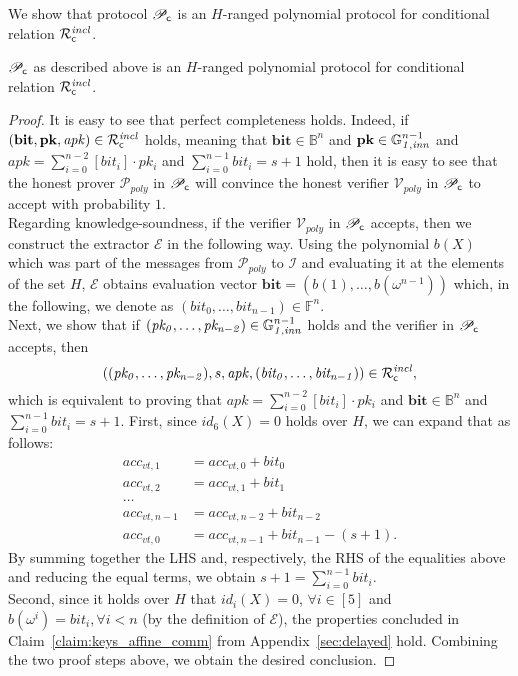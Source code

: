 \noindent We show that protocol $\mathscr{P}_{\mathsf{c}}$ is an $H$-ranged polynomial protocol for conditional relation 
$\mathcal{R}^{\mathit{incl}}_{\mathsf{c}}$. 

\begin{lemma} $\mathscr{P}_{\mathsf{c}}$ as described above is an $H$-ranged polynomial protocol for conditional relation $\mathcal{R}^{\mathit{incl}}_{\mathsf{c}}$.
\end{lemma}

\begin{proof}
It is easy to see that perfect completeness holds. Indeed, if $(\mathbf{bit},\mathbf{pk}, \mathit{apk}) \in \mathcal{R}^{\mathit{incl}}_{\mathsf{c}}$ holds, 
meaning that $\mathbf{bit} \in \mathbb{B}^n$ and $\mathbf{pk} \in \mathbb{G}_{\mathit{1,inn}}^{n-1}$ and $\mathit{apk} = \sum_{i=0}^{n-2} [\mathit{bit_i}] \cdot \mathit{pk_i}$ and 
$\sum_{i=0}^{n-1} \mathit{bit_i} = s+1$ hold, then it is easy to see that the honest prover $\mathcal{P}_{poly}$ in $\mathscr{P}_{\mathsf{c}}$ will convince the honest 
verifier $\mathcal{V}_{poly}$ in $\mathscr{P}_{\mathsf{c}}$ to accept with probability $1$. \\
Regarding knowledge-soundness, if the verifier $\mathcal{V}_{poly}$ in $\mathscr{P}_{\mathsf{c}}$ accepts, 
then we construct the extractor $\mathcal{E}$ in the following way. Using the polynomial $b(X)$ which 
was part of the messages from $\mathcal{P}_{poly}$ to $\mathcal{I}$ and evaluating it at the elements of the set 
$H$, $\mathcal{E}$ obtains evaluation vector $\mathbf{bit} = (b(1), \ldots, b(\omega^{n-1}))$ which, 
in the following, we denote as $(\mathit{bit}_0, \ldots, \mathit{bit}_{n-1}) \in \mathbb{F}^n$.\\ 
\noindent Next, we show that if $(\mathit{pk_0}, \ldots, \mathit{pk_{n-2}}) \in \mathbb{G}_{\mathit{1,inn}}^{n-1}$ holds and the 
verifier in $\mathscr{P}_{\mathsf{c}}$ accepts, then 
$$((\mathit{pk_0}, \ldots, \mathit{pk_{n-2}}), s, \mathit{apk}, (\mathit{bit_0}, \ldots, \mathit{bit_{n-1}})) \in \mathcal{R}^{\mathit{incl}}_{\mathsf{c}},$$ 
which is equivalent to proving that $\mathit{apk} = \sum_{i=0}^{n-2} [\mathit{bit_i}]  \cdot \mathit{pk_i}$ and 
$\mathbf{bit} \in \mathbb{B}^n$ and  $\sum_{i=0}^{n-1} \mathit{bit_i} = s+1$.
\noindent First, since $id_6(X) = 0$ holds over $H$, we can expand that as follows:
\begin{align*}
acc_{vt,1} &= acc_{vt,0} + \mathit{bit}_{0} \\
acc_{vt, 2} &= acc_{vt,1} + \mathit{bit}_{1} \\
\ldots \\
acc_{vt,n-1} &= acc_{vt,n-2} + \mathit{bit}_{n-2} \\
acc_{vt,0} &= acc_{vt,n-1} + \mathit{bit}_{n-1} - (s+1).
\end{align*}
\noindent By summing together the LHS and, respectively, the RHS of the equalities above and 
reducing the equal terms, we obtain $s+1 = \sum_{i=0}^{n-1}\mathit{bit}_i$. \\ 
Second, since it holds over $H$ that $id_i(X) = 0$, $\forall i \in [5]$ and $b(\omega^i) = \mathit{bit_i}, \forall i<n$ (by the definition 
of $\mathcal{E}$), the properties concluded in Claim~\ref{claim:keys_affine_comm} from Appendix~\ref{sec:delayed} hold. 
Combining the two proof steps above, we obtain the desired conclusion.
\end{proof}

